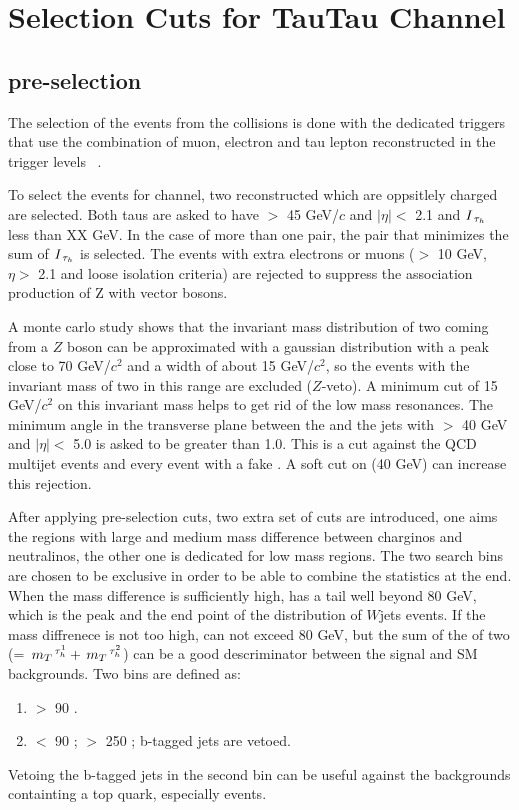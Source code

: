 \section{Selection Cuts for TauTau Channel}
\label{sect:tauTauCuts}
\subsection{pre-selection}
The selection of the events from the collisions is done with the dedicated triggers that use the combination of muon, electron 
and tau lepton reconstructed in the trigger levels ~\cite{CMS:2013hoa,Chatrchyan:2012xi,Chatrchyan:2011nv}.

To select the events for \Tau\Tau channel, two reconstructed \Tau which are oppsitlely charged are selected. Both taus are asked to 
have \PT $>$ 45 GeV/$c$ and $|\eta| <$ 2.1 and $I_{\,\tau_{h}}$ less than XX GeV. In the case of more than one pair, the pair that minimizes the sum of
$I_{\,\tau_{h}}$ is selected.
The events with extra electrons or muons (\PT $>$ 10 GeV, $\eta >$ 2.1 and loose isolation criteria) 
are rejected to suppress the association production of Z with vector bosons.

A monte carlo study shows that the invariant mass distribution of two \Tau coming from a $Z$ boson can be approximated with a gaussian 
distribution with a peak close to 70 GeV/$c^2$ and a width of about 15 GeV/$c^2$, so the events with the invariant mass of  
two \Tau in this range are excluded ($Z$-veto). A minimum cut of 15 GeV/$c^2$ on this invariant mass helps to get rid of the low mass
resonances. The minimum angle in the transverse plane between the \MET and the jets with \PT $>$ 40 GeV and $|\eta| <$ 5.0 
is asked to be greater than 1.0. This is a cut against the QCD multijet events and every event with a fake \MET. A soft cut on 
\mttwo (40 GeV) can increase this rejection.

After applying pre-selection cuts, two extra set of cuts are introduced, one aims the regions with large and medium mass difference between 
charginos and neutralinos, the other one is dedicated for low mass regions. The two search bins are chosen to be exclusive in order 
to be able to combine the statistics at the end. When the mass difference is sufficiently high, \mttwo has a tail well beyond 80 GeV, which is 
the peak  and the end point of the \mt distribution of $W$jets events. If the mass diffrenece is not too high, \mttwo can not exceed 80 GeV, 
but the sum of the \mt of two \Tau (\SumMT = $\,{m_T}^{\,\tau_{h}^1} + \,{m_T}^{\,\tau_{h}^2}$) can be a good descriminator between the signal and SM backgrounds. 
Two bins are defined as:
\begin{enumerate}
\item \mttwo $>$ 90 \GeV.
\item \mttwo $<$ 90 \GeV; \SumMT $>$ 250 \GeV; b-tagged jets are vetoed.
\end{enumerate}
Vetoing the b-tagged jets in the second bin can be useful against the backgrounds containting a top quark, especially \ttbar events. 

